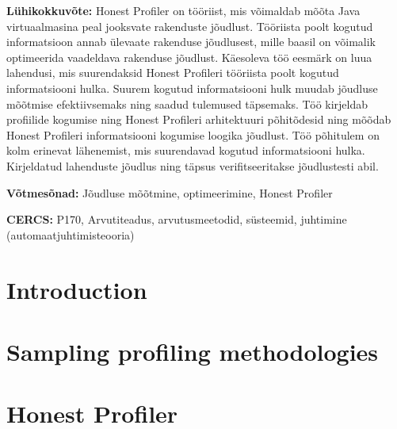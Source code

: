 \documentclass{style/thesis}
\begin{document}
\vspace*{5ex}
\noindent\textbf{\large \articleNameEE}
\vspace*{3ex}

\begin{flushleft}
\noindent\textbf{Lühikokkuvõte:} 
  Honest Profiler on tööriist, mis võimaldab mõõta Java virtuaalmasina peal jooksvate rakenduste jõudlust. Tööriista poolt kogutud informatsioon annab ülevaate rakenduse jõudlusest, mille baasil on võimalik optimeerida vaadeldava rakenduse jõudlust. Käesoleva töö eesmärk on luua lahendusi, mis suurendaksid Honest Profileri tööriista poolt kogutud informatsiooni hulka. Suurem kogutud informatsiooni hulk muudab jõudluse mõõtmise efektiivsemaks ning saadud tulemused täpsemaks. Töö kirjeldab profiilide kogumise ning Honest Profileri arhitektuuri põhitõdesid ning mõõdab Honest Profileri informatsiooni kogumise loogika jõudlust. Töö põhitulem on kolm erinevat lähenemist, mis suurendavad kogutud informatsiooni hulka. Kirjeldatud lahenduste jõudlus ning täpsus verifitseeritakse jõudlustesti abil.
\end{flushleft}
\vspace*{3ex}

\begin{flushleft}
  \textbf{Võtmesõnad:} 
  Jõudluse mõõtmine, optimeerimine, Honest Profiler
\end{flushleft}
\vspace*{3ex}

\noindent\textbf{CERCS:} 
  P170, Arvutiteadus, arvutusmeetodid, süsteemid, juhtimine (automaatjuhtimisteooria)
\newpage

\tableofcontents

\newpage
\section{Introduction}


\pagebreak

\section{Sampling profiling methodologies}
\label{sec:profiling}


\pagebreak


\section{Honest Profiler}
\label{sec:honest-profiler}

\end{document}
